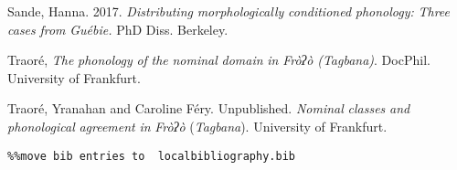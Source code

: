 Sande, Hanna. 2017. \textit{Distributing} \textit{morphologically} \textit{conditioned} \textit{phonology:} \textit{Three} \textit{cases} \textit{from} \textit{Guébie.} PhD Diss. Berkeley.

Traoré, \citet{Yranahan2018} \textit{The} \textit{phonology} \textit{of} \textit{the} \textit{nominal} \textit{domain} \textit{in} \textit{Fròʔò} \textit{(Tagbana)}. DocPhil. University of Frankfurt.

Traoré, Yranahan and Caroline Féry. Unpublished. \textit{Nominal} \textit{classes} \textit{and} \textit{phonological} \textit{agreement} \textit{in} \textit{Fròʔò} (\textit{Tagbana}). University of Frankfurt. 


\begin{verbatim}%%move bib entries to  localbibliography.bib
\end{verbatim}